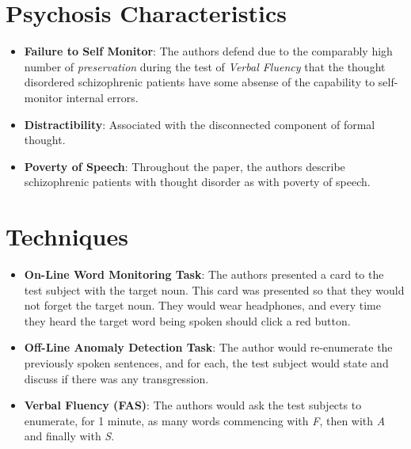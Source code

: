 \documentclass{Paper_Summary}
\begin{document}
\section{Psychosis Characteristics}
    \begin{itemize}
        \item \textbf{Failure to Self Monitor}: The authors defend due to the comparably high number of \emph{preservation} during the test of \emph{Verbal Fluency} that the thought disordered schizophrenic patients have some absense of the capability to self-monitor internal errors.
        \item \textbf{Distractibility}: Associated with the disconnected component of formal thought.
        \item \textbf{Poverty of Speech}: Throughout the paper, the authors describe schizophrenic patients with thought disorder as with poverty of speech.
    \end{itemize}

\section{Techniques}
    \begin{itemize}
        \item \textbf{On-Line Word Monitoring Task}: The authors presented a card to the test subject with the target noun. This card was presented so that they would not forget the target noun. They would wear headphones, and every time they heard the target word being spoken should click a red button.
        \item \textbf{Off-Line Anomaly Detection Task}: The author would re-enumerate the previously spoken sentences, and for each, the test subject would state and discuss if there was any transgression.
        \item \textbf{Verbal Fluency (FAS)}: The authors would ask the test subjects to enumerate, for 1 minute, as many words commencing with \emph{F}, then with \emph{A} and finally with \emph{S}.
    \end{itemize}
\end{document}
